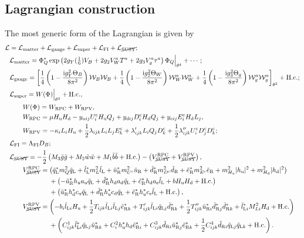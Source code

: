 \documentclass[CheatSheet]{subfiles}
\begin{document}
\subsection{Lagrangian construction}
The most generic form of the Lagrangian is given by
\begin{align}
\mathcal L &= \mathcal L\w{matter}+\mathcal L\w{gauge} + \mathcal L\w{super} + \mathcal L\w{FI} + \mathcal L_{\text{\cancel{SUSY}}};
\\%
&\mathcal L\w{matter}=
\Phi_Q^*
\exp\left(2g_Y(\tfrac16)V_B+2g_2V_W^aT^a+2g_3V_g^a\tau^a\right)\Phi_Q\Big|_{\theta^4} + \cdots;
\\&
\mathcal L\w{gauge}
=
\left[
 \frac14\left(1-\frac{\ii g_Y^2\Theta_B}{8\pi^2}\right)\mathcal W_B\mathcal W_B
+ \frac14\left(1-\frac{\ii g_2^2\Theta_W}{8\pi^2}\right)\mathcal W_W^a\mathcal W_W^a
+ \frac14\left(1-\frac{\ii g_3^2\Theta_g}{8\pi^2}\right)\mathcal W_g^a\mathcal W_g^a
\right]_{\theta^2} +\text{H.c.};
\\&
\mathcal L\w{super} = W(\Phi)\Big|_{\theta^2}+\text{H.c.},
\\&\qquad W(\Phi)=W\w{RPC}+W\w{RPV},
\\&\qquad
 W\w{RPC} = \mu\Hu\Hd
           - \yu[ij] U^\cc_i\Hu Q_j
           + \yd[ij] D^\cc_i\Hd Q_j
           + \ye[ij] E^\cc_i\Hd L_j,
\\&\qquad
 W\w{RPV} = -\kappa_i L_i\Hu 
           + \frac12 \lambda  _{ijk} L_i L_j E^\cc_k
           +         \lambda' _{ijk} L_i Q_j D^\cc_k
           + \frac12 \lambda''_{ijk} U^\cc_i D^\cc_j D^\cc_k;
\\&
\mathcal L\w{FI}=\Lambda\w{FI} D_B;
\\&
\mathcal L_{\text{\cancel{SUSY}}}=
- \frac12\left(M_3\tig\tig+M_2\tiw\tiw+M_1\tib\tib+\text{H.c.}\right)
-
\left(
V^{\mathrm{RPC}}_{\text{\cancel{SUSY}}}
+V^{\mathrm{RPV}}_{\text{\cancel{SUSY}}}\right),
\\&\qquad
V^{\mathrm{RPC}}_{\text{\cancel{SUSY}}}=
\left(\tqL^*m_Q^2\tqL+\tlL^*m_L^2\tlL+\tuR^* m_{U^\cc}^2\tuR + \tdR^* m_{D^\cc}^2\tdR + \teR^* m_{E^\cc}^2\teR
       +m^2_{\Hu}|\hu|^2 + m^2_{\Hd}|\hd|^2\right)
\notag\\&\qquad\qquad\qquad
       +\left(-\tuR^*\hu {a\w u}\tqL + \tdR^* \hd {a\w d} \tqL+ \teR^* \hd {a\w e} \tlL + b\Hu\Hd+\text{H.c.}\right)
\notag\\&\qquad\qquad\qquad
       +\left(\tuR^*\hd^*{c\w u}\tqL+\tdR^* \hu^*{c\w d}\tqL+\teR^*\hu^*{c\w e}\tlL+\text{H.c.}\right),
\\&\qquad
V^{\mathrm{RPV}}_{\text{\cancel{SUSY}}}
=
    \left(-b_i\tlL[i]\Hu +\frac12T_{ijk}\tlL[i]\tlL[j]\teR[k]^*+T'_{ijk}\tlL[i]\tqL[j]\tdR[k]^*
             +\frac12T''_{ijk}\tuR[i]^*\tdR[j]^*\tdR[k]^*
    +\tlL[i]^*M^2_{Li}\Hd+\text{H.c.}\right)
\notag\\&\qquad\qquad\qquad
   + \left(C^1_{ijk}\tlL[i]^*\tqL[j]\tuR[k]^* + C^2_i\hu^*\hd\teR[i]^* + C^3_{ijk}\tdR[i]\tuR[j]^*\teR[k]^*+\frac12C^4_{ijk}\tdR[i]\tqL[j]\tqL[k]+\text{H.c.}\right).
\end{align}
\end{document}
